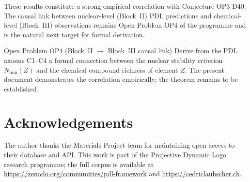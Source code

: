 \documentclass[11pt,a4paper]{article}
\theoremstyle{definition}
\theoremstyle{remark}
\begin{document}
These results constitute a strong empirical correlation with Conjecture OP3-D40. The causal link between nuclear-level (Block~II) PDL predictions and chemical-level (Block~III) observations remains Open Problem OP4 of the programme and is the natural next target for formal derivation.

\begin{pdlopen}{Open Problem OP4 (Block~II $\to$ Block~III causal link)}
Derive from the PDL axioms C1--C4 a formal connection between the nuclear stability criterion $N_{\min}(Z)$ and the chemical compound richness of element $Z$. The present document demonstrates the correlation empirically; the theorem remains to be established.
\end{pdlopen}

\section*{Acknowledgements}

The author thanks the Materials Project team for maintaining open access to their database and API. This work is part of the Projective Dynamic Logo research programme; the full corpus is available at \url{https://zenodo.org/communities/pdl-framework} and \url{https://cedriclaubscher.ch}.



\end{document}
